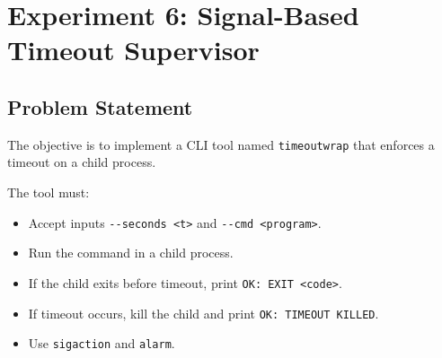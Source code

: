 
\section{Experiment 6: Signal-Based Timeout Supervisor}

\subsection{Problem Statement}
The objective is to implement a CLI tool named \texttt{timeoutwrap} that enforces a timeout on a child process.

The tool must:
\begin{itemize}
    \item Accept inputs \verb|--seconds <t>| and \verb|--cmd <program>|.
    \item Run the command in a child process.
    \item If the child exits before timeout, print \verb|OK: EXIT <code>|.
    \item If timeout occurs, kill the child and print \verb|OK: TIMEOUT KILLED|.
    \item Use \verb|sigaction| and \verb|alarm|.
\end{itemize}

